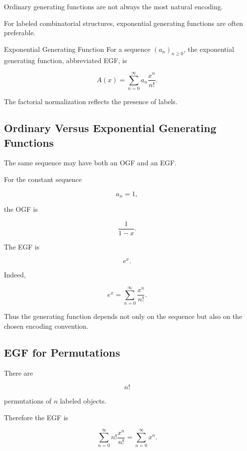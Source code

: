 Ordinary generating functions are not always the most natural encoding.

For labeled combinatorial structures, exponential generating functions
are often preferable.

\begin{definitionbox}{Exponential Generating Function}
For a sequence \((a_n)_{n\geq0}\), the exponential generating function,
abbreviated EGF, is

\[
\boxed{
A(x)
=
\sum_{n=0}^{\infty}
a_n\frac{x^n}{n!}.
}
\]
\end{definitionbox}

The factorial normalization reflects the presence of labels.

\subsection{Ordinary Versus Exponential Generating Functions}
\label{subsec:ogf-versus-egf}

The same sequence may have both an OGF and an EGF.

For the constant sequence

\[
a_n=1,
\]

the OGF is

\[
\boxed{
\frac{1}{1-x}.
}
\]

The EGF is

\[
\boxed{
e^x.
}
\]

Indeed,

\[
e^x
=
\sum_{n=0}^{\infty}
\frac{x^n}{n!}.
\]

Thus the generating function depends not only on the sequence but also
on the chosen encoding convention.

\subsection{EGF for Permutations}
\label{subsec:egf-permutations}

There are

\[
n!
\]

permutations of \(n\) labeled objects.

Therefore the EGF is

\[
\sum_{n=0}^{\infty}
n!
\frac{x^n}{n!}
=
\sum_{n=0}^{\infty}x^n.
\]

